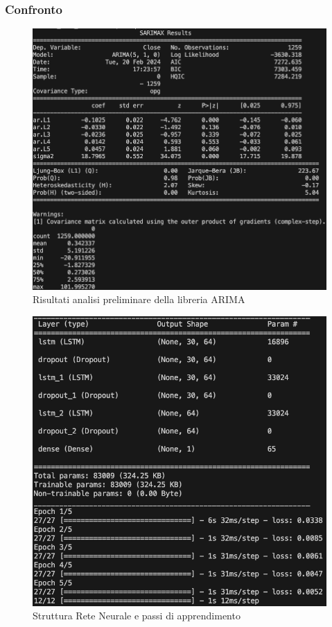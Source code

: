 \documentclass[a4paper,12pt]{article}
\begin{document}
            \subsubsection{Confronto}
                \begin{figure}[H]
                    \includegraphics[width=\textwidth]{ARIMA1.png}
                    \caption{Risultati analisi preliminare della libreria 
                    ARIMA}
                \end{figure}
                \begin{figure}[H]
                    \includegraphics[width=\textwidth]{LSTM1.png}
                    \caption{Struttura Rete Neurale e passi di apprendimento}
                \end{figure}
\end{document}

